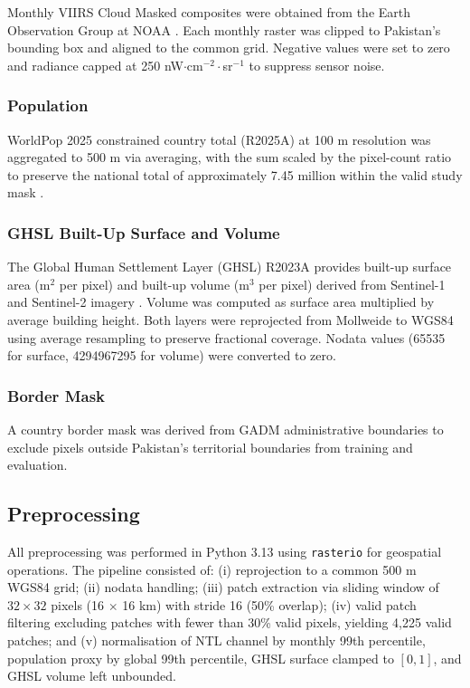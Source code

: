 \documentclass[conference]{IEEEtran}
\begin{document}
Monthly VIIRS Cloud Masked composites were obtained from the Earth Observation Group at NOAA \cite{eog2025viirs}. Each monthly raster was clipped to Pakistan's bounding box and aligned to the common grid. Negative values were set to zero and radiance capped at 250 nW$\cdot$cm$^{-2}\cdot$sr$^{-1}$ to suppress sensor noise.

\subsubsection{Population}

WorldPop 2025 constrained country total (R2025A) at 100 m resolution was aggregated to 500 m via averaging, with the sum scaled by the pixel-count ratio to preserve the national total of approximately 7.45 million within the valid study mask \cite{worldpop2025}.

\subsubsection{GHSL Built-Up Surface and Volume}

The Global Human Settlement Layer (GHSL) R2023A provides built-up surface area (m$^2$ per pixel) and built-up volume (m$^3$ per pixel) derived from Sentinel-1 and Sentinel-2 imagery \cite{pesaresi2023ghslv}. Volume was computed as surface area multiplied by average building height. Both layers were reprojected from Mollweide to WGS84 using average resampling to preserve fractional coverage. Nodata values (65535 for surface, 4294967295 for volume) were converted to zero.

\subsubsection{Border Mask}

A country border mask was derived from GADM administrative boundaries to exclude pixels outside Pakistan's territorial boundaries from training and evaluation.

\subsection{Preprocessing}
\label{subsec:preprocessing}

All preprocessing was performed in Python 3.13 using \texttt{rasterio} for geospatial operations. The pipeline consisted of: (i) reprojection to a common 500 m WGS84 grid; (ii) nodata handling; (iii) patch extraction via sliding window of $32 \times 32$ pixels (16 $\times$ 16 km) with stride 16 (50\% overlap); (iv) valid patch filtering excluding patches with fewer than 30\% valid pixels, yielding 4,225 valid patches; and (v) normalisation of NTL channel by monthly 99th percentile, population proxy by global 99th percentile, GHSL surface clamped to $[0, 1]$, and GHSL volume left unbounded.
\end{document}
